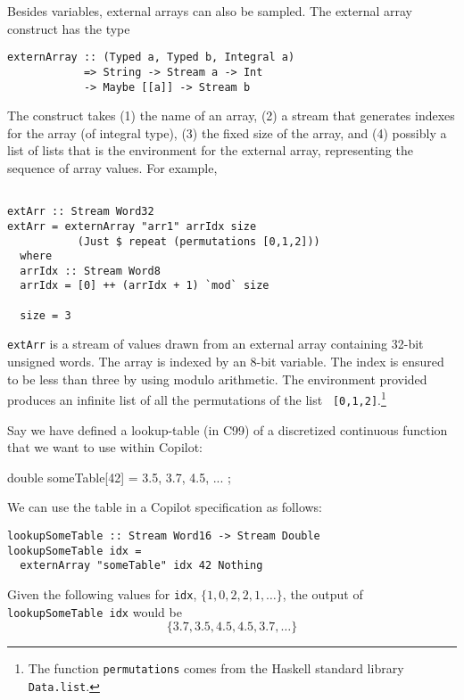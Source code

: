 Besides variables, external arrays can also be sampled.  The
external array construct has the type
%
\begin{lstlisting}[language = Copilot, frame = single]
externArray :: (Typed a, Typed b, Integral a)
            => String -> Stream a -> Int
            -> Maybe [[a]] -> Stream b
\end{lstlisting}
%
The construct takes (1) the name of an array, (2) a stream that generates indexes for
the array (of integral type), (3) the fixed size of the array, and (4) possibly a list of lists that is the
environment for the external array, representing the sequence of array values.  For example,
%
\begin{lstlisting}[language = Copilot, frame = single]

extArr :: Stream Word32
extArr = externArray "arr1" arrIdx size
           (Just $ repeat (permutations [0,1,2]))
  where
  arrIdx :: Stream Word8
  arrIdx = [0] ++ (arrIdx + 1) `mod` size

  size = 3
\end{lstlisting}
{\tt extArr} is a stream of values drawn from an external array containing
32-bit unsigned words.  The array is indexed by an 8-bit variable.  The index
is ensured to be less than three by using modulo arithmetic.  The environment
provided produces an infinite list of all the permutations of the list {\tt
  [0,1,2]}.\footnote{The function {\tt permutations} comes from the Haskell
    standard library {\tt Data.list}.}



%
\begin{example}
\label{exm:e}
Say we have defined a lookup-table (in C99) of a discretized continuous function that we want to use
within Copilot:
%
\begin{code}[frame = single]
double someTable[42] = { 3.5, 3.7, 4.5, ... };
\end{code}
%
We can use the table in a Copilot specification as follows:
%
\begin{lstlisting}[language = Copilot, frame = single]
lookupSomeTable :: Stream Word16 -> Stream Double
lookupSomeTable idx =
  externArray "someTable" idx 42 Nothing
\end{lstlisting}
%
Given the following values for \texttt{idx}, $\{1, 0, 2, 2, 1, \dots \}$, the output of
\texttt{lookupSomeTable idx} would be $$\{3.7, 3.5, 4.5, 4.5, 3.7, \dots \}$$
\end{example}

